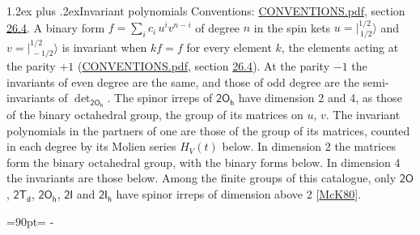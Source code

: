 \documentclass[10pt,a4paper]{article}
\makeatletter
\renewcommand\section{\@startsection{section}{1}{\z@}{-3ex plus -1ex minus -.2ex}%
  {1.2ex plus .2ex}{\normalfont\large\sffamily\bfseries\color{parttitle}}}
\newcommand{\needspace}[1]{\par\penalty-100\begingroup\dimen0=#1\relax\dimen2=\pagegoal
  \advance\dimen2-\pagetotal\ifdim\dimen0>\dimen2\relax\ifdim\dimen2>0pt\vfil\break\fi\fi
  \endgroup}
\numberwithin{equation}{section}
\newcommand{\grp}[1]{\mathsf{#1}}
\newcommand{\jm}[2]{\bigl\lvert{}^{#1}_{\,#2}\bigr\rangle}
\makeatother
\begin{document}
\section{Invariant polynomials}\label{s:invariants}
Conventions: \href{../../CONVENTIONS.pdf}{CONVENTIONS.pdf}, section \href{../../CONVENTIONS.pdf\#conv.26.4}{26.4}.
\leavevmode\label{n:local.binary.form}A binary form $f = \sum_i c_i\, u^i v^{n-i}$ of degree $n$ in the spin kets $u = \jm{1/2}{1/2}$ and $v = \jm{1/2}{-1/2}$ is invariant when $k f = f$ for every element $k$, the elements acting at the parity $+1$ (\href{../../CONVENTIONS.pdf}{CONVENTIONS.pdf}, section \href{../../CONVENTIONS.pdf\#conv.26.4}{26.4}). At the parity $-1$ the invariants of even degree are the same, and those of odd degree are the semi-invariants of $\det_{\grp{2O_{h}}}$.
The spinor irreps of $\grp{2O_{h}}$ have dimension 2 and 4, as those of the binary octahedral group, the group of its matrices on $u$, $v$. \label{n:function.hilbert}The invariant polynomials in the partners of one are those of the group of its matrices, counted in each degree by its Molien series $H_V(t)$ below. In dimension 2 the matrices form the binary octahedral group, with the binary forms below. In dimension 4 the invariants are those below. Among the finite groups of this catalogue, only $\grp{2O}$, $\grp{2T_{d}}$, $\grp{2O_{h}}$, $\grp{2I}$ and $\grp{2I_{h}}$ have spinor irreps of dimension above 2 [\href{../../../REFERENCES.pdf\#ref.McK80}{McK80}].
\needspace{90pt}
\end{document}

